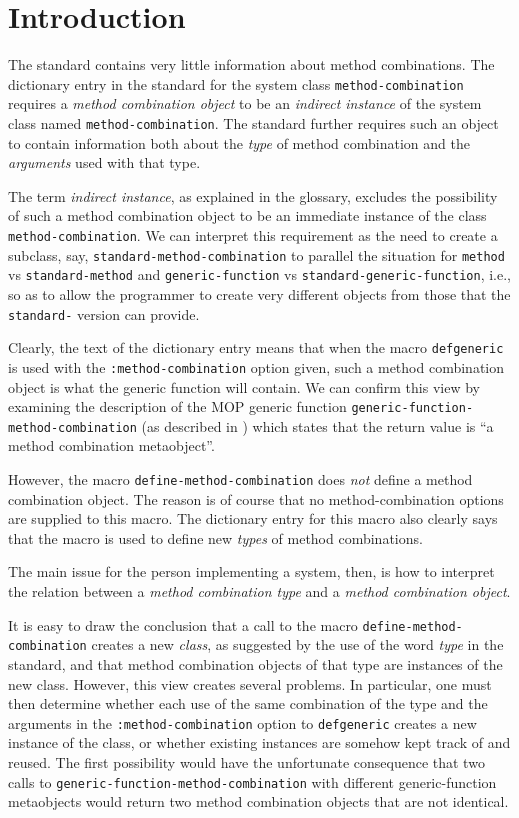 \section{Introduction}
\label{sec-introduction}

The \commonlisp{} standard \cite{ansi:common:lisp} contains very
little information about method combinations.  The dictionary entry in
the standard for the system class \texttt{method-combination} requires
a \emph{method combination object} to be an \emph{indirect instance}
of the system class named \texttt{method-combination}.  The standard
further requires such an object to contain information both about the
\emph{type} of method combination and the \emph{arguments} used with
that type.

The term \emph{indirect instance}, as explained in the glossary,
excludes the possibility of such a method combination object to be an
immediate instance of the class \texttt{method-combination}.  We can
interpret this requirement as the need to create a subclass, say,
\texttt{standard-method-combination} to parallel the situation for
\texttt{method} vs \texttt{standard-method} and
\texttt{generic-function} vs \texttt{standard-generic-function}, i.e.,
so as to allow the programmer to create very different objects from
those that the \texttt{standard-} version can provide.

Clearly, the text of the dictionary entry means that when the macro
\texttt{defgeneric} is used with the \texttt{:method-combination}
option given, such a method combination object is what the generic
function will contain.  We can confirm this view by examining the
description of the MOP generic function
\texttt{generic-function-method-combination} (as described in
\cite{Kiczales:1991:AMP:574212}) which states that the return value is
``a method combination metaobject''.

However, the macro \texttt{define-method-combination} does \emph{not}
define a method combination object.  The reason is of course that no
method-combination options are supplied to this macro.  The dictionary
entry for this macro also clearly says that the macro is used to
define new \emph{types} of method combinations.

The main issue for the person implementing a \commonlisp{} system,
then, is how to interpret the relation between a \emph{method
  combination type} and a \emph{method combination object}.

It is easy to draw the conclusion that a call to the macro
\texttt{define-method-combination} creates a new \emph{class}, as
suggested by the use of the word \emph{type} in the standard, and that
method combination objects of that type are instances of the new
class.  However, this view creates several problems.  In particular,
one must then determine whether each use of the same combination of
the type and the arguments in the \texttt{:method-combination} option
to \texttt{defgeneric} creates a new instance of the class, or whether
existing instances are somehow kept track of and reused.  The first
possibility would have the unfortunate consequence that two calls to
\texttt{generic-function-method-combination} with different
generic-function metaobjects would return two method combination
objects that are not identical.

